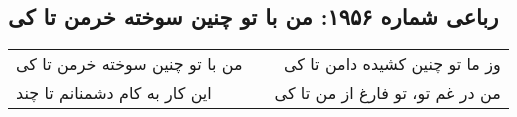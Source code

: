 \begin{center}
\section*{رباعی شماره ۱۹۵۶: من با تو چنین سوخته خرمن تا کی}
\label{sec:1956}
\begin{longtable}{l p{0.5cm} r}
من با تو چنین سوخته خرمن تا کی
&&
وز ما تو چنین کشیده دامن تا کی
\\
این کار به کام دشمنانم تا چند
&&
من در غم تو، تو فارغ از من تا کی
\\
\end{longtable}
\end{center}
